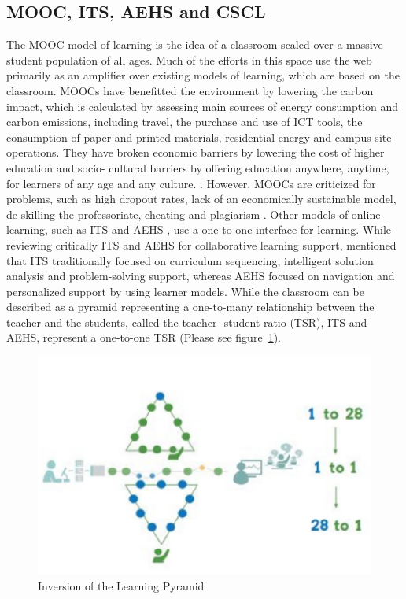 \begin{multicols}{2}
\section{MOOC, ITS, AEHS and CSCL}

The MOOC model of learning is the idea of a classroom scaled over a massive student population of all ages. Much of the efforts in this space use the web primarily as an amplifier over existing models of learning, which are based on the classroom. MOOCs have benefitted the environment by lowering the carbon impact, which is calculated by assessing main sources of energy consumption and carbon emissions, including travel, the purchase and use of ICT tools, the consumption of paper and printed materials, residential energy and campus site operations. They have broken economic barriers by lowering the cost of higher education \cite{art2-key29} and socio- cultural barriers by offering education anywhere, anytime, for learners of any age and any culture. \cite{art2-key25}. However, MOOCs are criticized for problems, such as high dropout rates, lack of an economically sustainable model, de-skilling the professoriate, cheating and plagiarism \cite{art2-key44}. Other models of online learning, such as ITS and AEHS \cite{art2-key05, art2-key10, art2-key18, art2-key39}, use a one-to-one interface for learning. While reviewing critically ITS and AEHS for collaborative learning support, \cite{art2-key35} mentioned that ITS traditionally focused on curriculum sequencing, intelligent solution analysis and problem-solving support, whereas AEHS focused on navigation and personalized support by using learner models. While the classroom can be described as a pyramid representing a one-to-many relationship between the teacher and the students, called the teacher- student ratio (TSR), ITS and AEHS, represent a one-to-one TSR (Please see figure~\ref{chap2-fig02}).

\begin{figure}[H]
\centering
\includegraphics[scale=1.1]{src/Figures/chap2/chap2-fig02.jpg}
\caption{Inversion of the Learning Pyramid}\label{chap2-fig02}
\end{figure}


\end{multicols}

